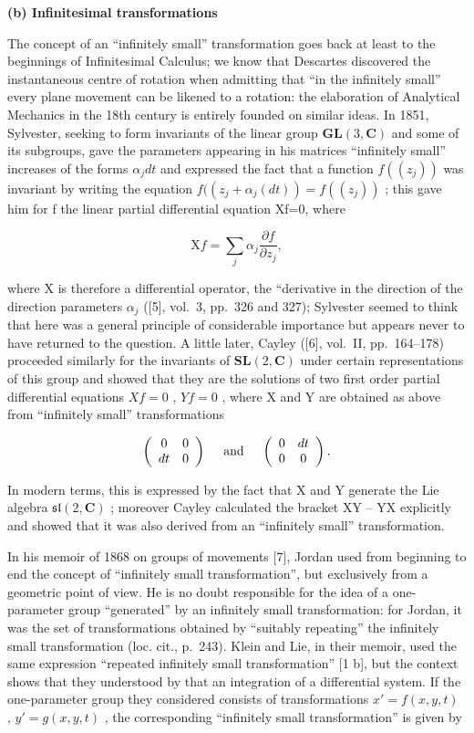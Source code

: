 \textbf{(b) Infinitesimal transformations}

The concept of an ``infinitely small'' transformation goes back at least to the beginnings of Infinitesimal Calculus; we know that Descartes discovered the instantaneous centre of rotation when admitting that ``in the infinitely small'' every plane movement can be likened to a rotation: the elaboration of Analytical Mechanics in the 18th century is entirely founded on similar ideas. In 1851, Sylvester, seeking to form invariants of the linear group \(\mathbf{GL}(3,\mathbf{C})\) and some of its subgroups, gave the parameters appearing in his matrices ``infinitely small'' increases of the forms \(\alpha_{j}dt\) and expressed the fact that a function \(f((z_{j}))\) was invariant by writing the equation \(f((z_{j}+\alpha_{j}(dt))=f((z_{j}))\) ; this gave him for f the linear partial differential equation Xf=0, where

\[
\mathrm{X} f = \sum_ {j} \alpha_ {j} \frac {\partial f}{\partial z _ {j}},\tag{1}
\]

where X is therefore a differential operator, the ``derivative in the direction of the direction parameters \(\alpha_{j}\) ({[}5{]}, vol.~3, pp.~326 and 327); Sylvester seemed to think that here was a general principle of considerable importance but appears never to have returned to the question. A little later, Cayley ({[}6{]}, vol.~II, pp.~164--178) proceeded similarly for the invariants of \(\mathbf{SL}(2,\mathbf{C})\) under certain representations of this group and showed that they are the solutions of two first order partial differential equations \(Xf=0\) , \(Yf=0\) , where X and Y are obtained as above from ``infinitely small'' transformations

\[
\left( \begin{array}{c c} 0 & 0 \\ d t & 0 \end{array} \right) \quad \text { and } \quad \left( \begin{array}{c c} 0 & d t \\ 0 & 0 \end{array} \right).
\]

In modern terms, this is expressed by the fact that X and Y generate the Lie algebra \(\mathfrak{sl}(2,\mathbf{C})\) ; moreover Cayley calculated the bracket XY -- YX explicitly and showed that it was also derived from an ``infinitely small'' transformation.

In his memoir of 1868 on groups of movements {[}7{]}, Jordan used from beginning to end the concept of ``infinitely small transformation'', but exclusively from a geometric point of view. He is no doubt responsible for the idea of a one-parameter group ``generated'' by an infinitely small transformation: for Jordan, it was the set of transformations obtained by ``suitably repeating'' the infinitely small transformation (loc. cit., p.~243). Klein and Lie, in their memoir, used the same expression ``repeated infinitely small transformation'' {[}1 b{]}, but the context shows that they understood by that an integration of a differential system. If the one-parameter group they considered consists of transformations \(x' = f(x, y, t)\) , \(y' = g(x, y, t)\) , the corresponding ``infinitely small transformation'' is given by

